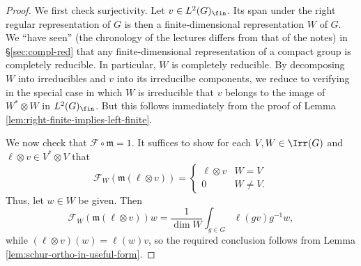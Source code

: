 \documentclass[reqno]{amsart} 
\begin{document}
\begin{proof}
  We first check surjectivity.
  Let $v \in L^2(G)_{\fin}$.
  Its span under the right regular representation of $G$
  is then a finite-dimensional representation $W$ of $G$.
  We ``have seen'' (the chronology of the lectures
  differs from that of the notes)
  in \S\ref{sec:compl-red}
  that any finite-dimensional representation
  of a compact group is completely reducible.
  In particular, $W$ is completely reducible.
  By decomposing $W$ into irreducibles and $v$ into its
  irreducilbe components,
  we reduce to verifying in the special case in which $W$ is
  irreducible
  that $v$ belongs to the image of $W^* \otimes W$
  in $L^2(G)_{\fin}$.
  But this follows immediately
  from the proof of Lemma
  \ref{lem:right-finite-implies-left-finite}.

  We now check that $\mathcal{F} \circ \mathfrak{m}  = 1$.
  It suffices to show for each $V,W \in \Irr(G)$
  and $\ell \otimes v \in V^* \otimes V$
  that
  \begin{equation*}
  \mathcal{F}_W(\mathfrak{m}(\ell \otimes v))
  =
  \begin{cases}
    \ell \otimes v & W = V \\
    0 & W \neq V.
  \end{cases}
  \end{equation*}
  Thus, let $w \in W$ be given.
  Then
  \begin{equation*}
  \mathcal{F}_W(\mathfrak{m}(\ell \otimes v))
  w
  =
  \frac{1}{\dim W}
  \int_{g \in G} \ell(g v) g^{-1} w,
  \end{equation*}
  while $(\ell \otimes v)(w) = \ell(w) v$,
  so the required conclusion
  follows
  from Lemma \ref{lem:schur-ortho-in-useful-form}.



\end{proof}
\end{document}
